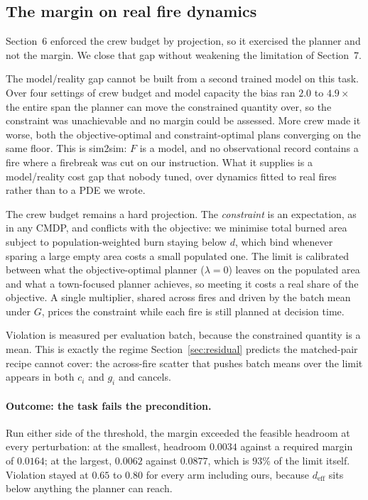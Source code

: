 \subsection{The margin on real fire dynamics}
\label{sec:ndwsmargin}

Section~6 enforced the crew budget by projection, so it exercised the planner
and not the margin. We close that gap without weakening the limitation of
Section~7.

The model/reality gap cannot be built from a second trained model on this task.
Over four settings of crew budget and model capacity the bias ran $2.0$ to
$4.9\times$ the entire span the planner can move the constrained quantity over,
so the constraint was unachievable and no margin could be assessed. More crew
made it worse, both the objective-optimal and constraint-optimal plans
converging on the same floor. This is
sim2sim: $F$ is a model, and no observational record contains a fire where a
firebreak was cut on our instruction. What it supplies is a model/reality cost
gap that nobody tuned, over dynamics fitted to real fires rather than to a PDE
we wrote.

The crew budget remains a hard projection. The \emph{constraint} is an
expectation, as in any CMDP, and conflicts with the objective: we minimise
total burned area subject to population-weighted burn staying below $d$, which
bind whenever sparing a large empty area costs a small populated one. The
limit is calibrated between what the objective-optimal planner ($\lambda=0$)
leaves on the populated area and what a town-focused planner achieves, so
meeting it costs a real share of the objective. A single multiplier, shared
across fires and driven by the batch mean under $G$, prices the constraint
while each fire is still planned at decision time.

Violation is measured per evaluation batch, because the constrained quantity
is a mean. This is exactly the regime Section~\ref{sec:residual} predicts the
matched-pair recipe cannot cover: the across-fire scatter that pushes batch
means over the limit appears in both $c_i$ and $g_i$ and cancels.

\paragraph{Outcome: the task fails the precondition.}
Run either side of the threshold, the margin exceeded the feasible headroom at
every perturbation: at the smallest, headroom $0.0034$ against a required
margin of $0.0164$; at the largest, $0.0062$ against $0.0877$, which is $93\%$
of the limit itself. Violation stayed at $0.65$ to $0.80$ for every arm
including ours, because $d_{\mathrm{eff}}$ sits below anything the planner can
reach.

